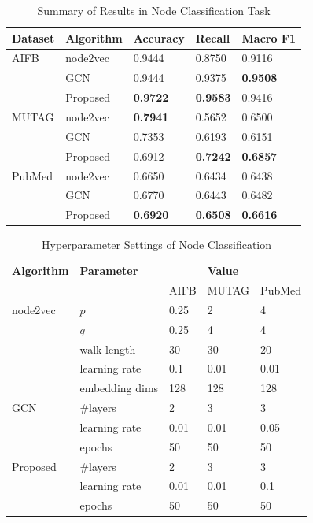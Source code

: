 \documentclass[sigconf]{acmart}
\begin{document}
\begin{table}[!ht]
    \centering
    \caption{Summary of Results in Node Classification Task}
    \label{tab:6-nc}
    \begin{tabular}{lllll}
        \toprule
        \textbf{Dataset} & \textbf{Algorithm} & \textbf{Accuracy} & \textbf{Recall} & \textbf{Macro F1}\\
        \midrule
        AIFB & node2vec & 0.9444 & 0.8750 & 0.9116\\
             & GCN & 0.9444 & 0.9375 & \textbf{0.9508}\\
             & Proposed & \textbf{0.9722} & \textbf{0.9583} & 0.9416\\
        MUTAG & node2vec & \textbf{0.7941} & 0.5652 & 0.6500\\
              & GCN & 0.7353 & 0.6193 & 0.6151\\
              & Proposed & 0.6912 & \textbf{0.7242} & \textbf{0.6857}\\
        PubMed & node2vec & 0.6650 & 0.6434 & 0.6438\\
               & GCN & 0.6770 & 0.6443 & 0.6482\\
               & Proposed & \textbf{0.6920} & \textbf{0.6508} & \textbf{0.6616}\\
        \bottomrule
    \end{tabular}
\end{table}

\begin{table}[!ht]
    \centering
    \caption{Hyperparameter Settings of Node Classification}
    \label{tab:6-nc-hyper}
    \begin{tabular}{lllll}
        \toprule
        \textbf{Algorithm} & \textbf{Parameter} & &\textbf{Value}&\\
                           &              & AIFB & MUTAG & PubMed\\
        \midrule
        node2vec & $p$ & 0.25 & 2 & 4\\
                 & $q$ & 0.25 & 4 & 4\\
                 & walk length & 30 & 30 & 20\\
                 & learning rate & 0.1 & 0.01 & 0.01\\
                 & embedding dims & 128 & 128 & 128\\
        GCN & \#layers & 2 & 3 & 3\\
            & learning rate & 0.01 & 0.01 & 0.05\\
            & epochs & 50 & 50 & 50\\
        Proposed & \#layers & 2 & 3 & 3\\
            & learning rate & 0.01 & 0.01 & 0.1\\
            & epochs & 50 & 50 & 50\\
       \bottomrule
    \end{tabular}
\end{table}
\end{document}
